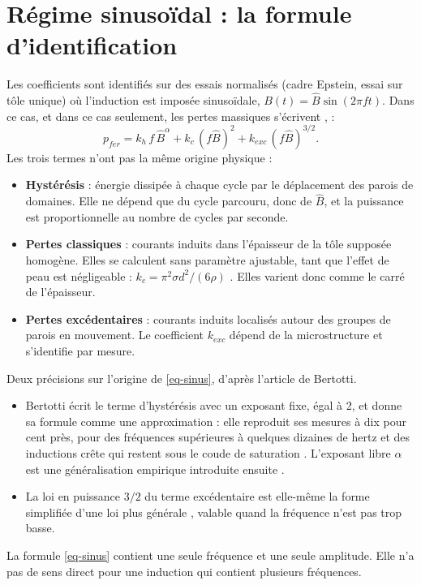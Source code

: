 \documentclass[11pt,a4paper]{article}
\newcommand{\Bc}{\hat{B}}
\begin{document}
\section{Régime sinusoïdal : la formule d'identification}

Les coefficients sont identifiés sur des essais normalisés (cadre Epstein, essai sur tôle unique) où l'induction est imposée sinusoïdale, $B(t) = \Bc \sin(2\pi f t)$. Dans ce cas, et dans ce cas seulement, les pertes massiques s'écrivent \cite[Eq.~3 et 18]{Ber88}, \cite[Eq.~13 et 57]{Hel21} :
\begin{equation}
    p_{fer} = k_h\, f\, \Bc^{\alpha} + k_c\,(f \Bc)^{2} + k_{exc}\,(f \Bc)^{3/2}.
    \label{eq-sinus}
\end{equation}
Les trois termes n'ont pas la même origine physique \cite[\S~I.1-B.2]{Hel21} :
\begin{itemize}
    \item \textbf{Hystérésis} : énergie dissipée à chaque cycle par le déplacement des parois de domaines. Elle ne dépend que du cycle parcouru, donc de $\Bc$, et la puissance est proportionnelle au nombre de cycles par seconde.
    \item \textbf{Pertes classiques} : courants induits dans l'épaisseur de la tôle supposée homogène. Elles se calculent sans paramètre ajustable, tant que l'effet de peau est négligeable : $k_c = \pi^2 \sigma d^2 / (6\rho)$ \cite[Eq.~2]{Ber88}. Elles varient donc comme le carré de l'épaisseur.
    \item \textbf{Pertes excédentaires} : courants induits localisés autour des groupes de parois en mouvement. Le coefficient $k_{exc}$ dépend de la microstructure et s'identifie par mesure.
\end{itemize}
Deux précisions sur l'origine de \eqref{eq-sinus}, d'après l'article de Bertotti.
\begin{itemize}
    \item Bertotti écrit le terme d'hystérésis avec un exposant fixe, égal à 2, et donne sa formule comme une approximation : elle reproduit ses mesures à dix pour cent près, pour des fréquences supérieures à quelques dizaines de hertz et des inductions crête qui restent sous le coude de saturation \cite[Eq.~18 et \S~IV]{Ber88}. L'exposant libre $\alpha$ est une généralisation empirique introduite ensuite \cite{Bog03,Yam10,Hel21}.
    \item La loi en puissance $3/2$ du terme excédentaire est elle-même la forme simplifiée d'une loi plus générale \cite[Eq.~9]{Ber88}, valable quand la fréquence n'est pas trop basse.
\end{itemize}
La formule \eqref{eq-sinus} contient une seule fréquence et une seule amplitude. Elle n'a pas de sens direct pour une induction qui contient plusieurs fréquences.
\end{document}
